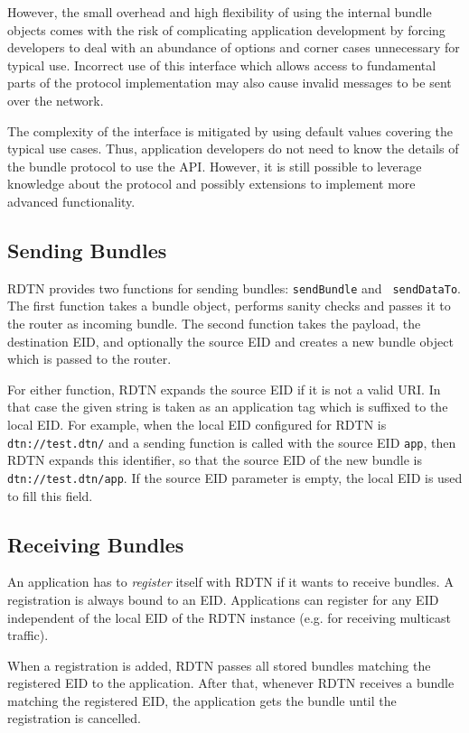 \documentclass[a4paper]{article}
\begin{document}
However, the small overhead and high flexibility of using the internal bundle
objects comes with the risk of complicating application development by forcing
developers to deal with an abundance of options and corner cases unnecessary for
typical use. Incorrect use of this interface which allows access to
fundamental parts of the protocol implementation may also cause invalid messages
to be sent over the network.

The complexity of the interface is mitigated by using default values covering the
typical use cases. Thus, application developers do not need to know the details
of the bundle protocol to use the API. However, it is still possible to leverage
knowledge about the protocol and possibly extensions to implement more advanced
functionality.

\subsection{Sending Bundles}\label{sec.sending}

RDTN provides two functions for sending bundles: {\tt sendBundle} and {\tt
sendDataTo}. The first function takes a bundle object, performs sanity checks
and passes it to the router as incoming bundle. The second function takes the
payload, the destination EID, and optionally the source EID and creates a new
bundle object which is passed to the router.

For either function, RDTN expands the source EID if it is not a valid URI. In
that case the given string is taken as an application tag which is suffixed to
the local EID. For example, when the local EID configured for RDTN is {\tt
dtn://test.dtn/} and a sending function is called with the source EID {\tt app},
then RDTN expands this identifier, so that the source EID of the new bundle is
{\tt dtn://test.dtn/app}. If the source EID parameter is empty, the local EID is
used to fill this field.

\subsection{Receiving Bundles}\label{sec.receiving}

An application has to {\em register} itself with RDTN if it wants to receive
bundles. A registration is always bound to an
EID.  Applications can register for any EID independent of the local EID of the
RDTN instance (e.g. for receiving multicast traffic).

When a registration is added, RDTN passes all stored bundles matching the
registered EID to the application. After that, whenever RDTN receives a bundle 
matching the registered EID, the application gets the bundle until the 
registration is cancelled.
\end{document}
